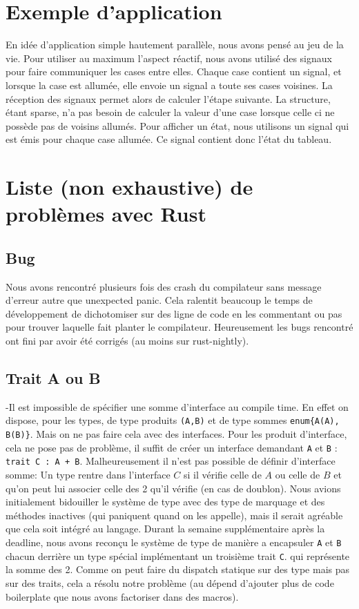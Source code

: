 \documentclass[a4paper]{article}
\renewcommand{\(}{\left(}
\renewcommand{\)}{\right)}
\begin{document}
\section{Exemple d'application}

En idée d'application simple hautement parallèle, nous avons pensé au jeu de la
vie. Pour utiliser au maximum l'aspect réactif, nous avons utilisé des signaux
pour faire communiquer les cases entre elles. Chaque case contient un signal, et
lorsque la case est allumée, elle envoie un signal a toute ses cases voisines.
La réception des signaux permet alors de calculer l'étape suivante. La
structure, étant sparse, n'a pas besoin de calculer la valeur d'une case lorsque
celle ci ne possède pas de voisins allumés. Pour afficher un état, nous
utilisons un signal qui est émis pour chaque case allumée. Ce signal contient
donc l'état du tableau.


\section{Liste (non exhaustive) de problèmes avec Rust}
\subsection{Bug}
Nous avons rencontré plusieurs fois des crash du compilateur sans message d'erreur
autre que \og unexpected panic\fg{}. Cela ralentit beaucoup le temps de
développement de dichotomiser sur des ligne de code en les commentant ou pas
pour trouver laquelle fait planter le compilateur. Heureusement les bugs
rencontré ont fini par avoir été corrigés (au moins sur rust-nightly).


\subsection{Trait A ou B}
-Il est impossible de spécifier une somme d'interface au compile time. En effet
on dispose, pour les types, de type produits \verb!(A,B)! et de type sommes
\verb!enum{A(A), B(B)}!. Mais on ne pas faire cela avec des interfaces. Pour les
produit d'interface, cela ne pose pas de problème, il suffit de créer un
interface demandant \verb!A! et \verb!B! : \verb!trait C : A + B!.
Malheureusement il n'est pas possible de définir d'interface somme: Un type
rentre dans l'interface $C$ si il vérifie celle de $A$ ou celle de $B$ et qu'on
peut lui associer celle des 2 qu'il vérifie (en cas de doublon). Nous avions initialement
bidouiller le système de type avec des type de marquage et des méthodes
inactives (qui paniquent quand on les appelle), mais il serait agréable
que cela soit intégré au langage. Durant la semaine supplémentaire après la
deadline, nous avons reconçu le système de type de manière a encapsuler \verb!A!
et \verb!B! chacun derrière un type spécial implémentant un troisième trait
\verb!C!. qui représente la somme des 2. Comme on peut faire du dispatch
statique sur des type mais pas sur des traits, cela a résolu notre problème (au
dépend d'ajouter plus de code boilerplate que nous avons factoriser dans des macros).
\end{document}

